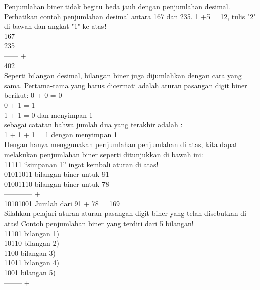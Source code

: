\documentclass{article}
\begin{document}
\begin{enumerate}
\begin{enumerate}
Penjumlahan biner tidak begitu beda jauh dengan penjumlahan desimal. Perhatikan contoh penjumlahan desimal antara 167 dan 235.
1 +5 = 12, tulis "2" di bawah dan angkat "1" ke atas! \\
167 \\
235 \\
------ + \\
402 \\

Seperti bilangan desimal, bilangan biner juga dijumlahkan dengan cara yang sama. Pertama-tama yang harus dicermati adalah aturan pasangan digit biner berikut:
0 + 0 = 0 \\
0 + 1 = 1 \\
1 + 1 = 0 \textrightarrow dan menyimpan 1 \\

sebagai catatan bahwa jumlah dua yang terakhir adalah : \\
1 + 1 + 1 = 1 \textrightarrow dengan menyimpan 1 \\

Dengan hanya menggunakan penjumlahan penjumlahan di atas, kita dapat melakukan penjumlahan biner seperti ditunjukkan di bawah ini: \\
11111 \textrightarrow “simpanan 1” ingat kembali aturan di atas! \\
01011011 \textrightarrow bilangan biner untuk 91 \\
01001110 \textrightarrow bilangan biner untuk 78 \\
------------ + \\
10101001 \textrightarrow Jumlah dari 91 + 78 = 169 \\

Silahkan pelajari aturan-aturan pasangan digit biner yang telah disebutkan di atas! Contoh penjumlahan biner yang terdiri dari 5 bilangan! \\
11101 bilangan 1) \\
10110 bilangan 2) \\
1100 bilangan 3) \\
11011 bilangan 4) \\
1001 bilangan 5) \\
-------- + \\


\end{enumerate}
\end{enumerate}
\end{document}
